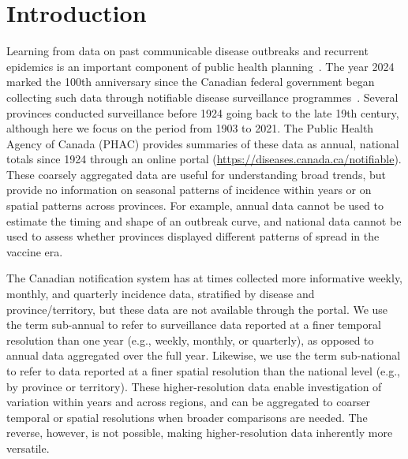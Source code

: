 \documentclass[10pt,letterpaper]{article}
\begin{document}

\section*{Introduction}

Learning from data on past communicable disease outbreaks and recurrent epidemics is an important component of public health planning~\cite{AndeMay91,Earn+00,BaucEarn03,HempEarn15,ogden2024mathematical}. The year 2024 marked the 100th anniversary since the Canadian federal government began collecting such data through notifiable disease surveillance programmes~\cite{summaryNotifiable1954,sockett1996communicable,carter1991establishing,doherty2000establishing,totten2019updates}. Several provinces conducted surveillance before 1924 going back to the late 19th century, although here we focus on the period from 1903 to 2021. The Public Health Agency of Canada (PHAC) provides summaries of these data as annual, national totals since 1924 through an online portal (\url{https://diseases.canada.ca/notifiable}). These coarsely aggregated data are useful for understanding broad trends, but provide no information on seasonal patterns of incidence within years or on spatial patterns across provinces. For example, annual data cannot be used to estimate the timing and shape of an outbreak curve, and national data cannot be used to assess whether provinces displayed different patterns of spread in the vaccine era.

The Canadian notification system has at times collected more informative weekly, monthly, and quarterly incidence data, stratified by disease and province/territory, but these data are not available through the portal. We use the term sub-annual to refer to surveillance data reported at a finer temporal resolution than one year (e.g., weekly, monthly, or quarterly), as opposed to annual data aggregated over the full year. Likewise, we use the term sub-national to refer to data reported at a finer spatial resolution than the national level (e.g., by province or territory). These higher-resolution data enable investigation of variation within years and across regions, and can be aggregated to coarser temporal or spatial resolutions when broader comparisons are needed. The reverse, however, is not possible, making higher-resolution data inherently more versatile.
\end{document}
